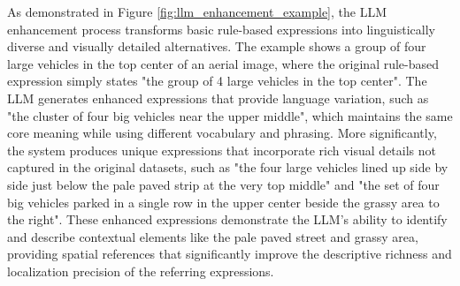 As demonstrated in Figure \ref{fig:llm_enhancement_example}, the LLM enhancement process transforms basic rule-based expressions into linguistically diverse and visually detailed alternatives. The example shows a group of four large vehicles in the top center of an aerial image, where the original rule-based expression simply states "the group of 4 large vehicles in the top center". The LLM generates enhanced expressions that provide language variation, such as "the cluster of four big vehicles near the upper middle", which maintains the same core meaning while using different vocabulary and phrasing. More significantly, the system produces unique expressions that incorporate rich visual details not captured in the original datasets, such as "the four large vehicles lined up side by side just below the pale paved strip at the very top middle" and "the set of four big vehicles parked in a single row in the upper center beside the grassy area to the right". These enhanced expressions demonstrate the LLM's ability to identify and describe contextual elements like the pale paved street and grassy area, providing spatial references that significantly improve the descriptive richness and localization precision of the referring expressions.

